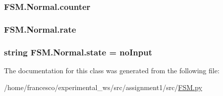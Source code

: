 \subsubsection[{\texorpdfstring{counter}{counter}}]{\setlength{\rightskip}{0pt plus 5cm}F\+S\+M.\+Normal.\+counter}\hypertarget{classFSM_1_1Normal_aeeb78ed66cc617acb7ac428aa2507b6d}{}\label{classFSM_1_1Normal_aeeb78ed66cc617acb7ac428aa2507b6d}
\subsubsection[{\texorpdfstring{rate}{rate}}]{\setlength{\rightskip}{0pt plus 5cm}F\+S\+M.\+Normal.\+rate}\hypertarget{classFSM_1_1Normal_a99ce5b8dddfae4e6a49f4c1d292b5d83}{}\label{classFSM_1_1Normal_a99ce5b8dddfae4e6a49f4c1d292b5d83}
\subsubsection[{\texorpdfstring{state}{state}}]{\setlength{\rightskip}{0pt plus 5cm}string F\+S\+M.\+Normal.\+state = \textquotesingle{}no\+Input\textquotesingle{}\hspace{0.3cm}{\ttfamily [static]}}\hypertarget{classFSM_1_1Normal_a12ba58b7a0cac9ae3da6f13916150c7b}{}\label{classFSM_1_1Normal_a12ba58b7a0cac9ae3da6f13916150c7b}


The documentation for this class was generated from the following file\+:\begin{DoxyCompactItemize}
\item 
/home/francesco/experimental\+\_\+ws/src/assignment1/src/\hyperlink{FSM_8py}{F\+S\+M.\+py}\end{DoxyCompactItemize}
